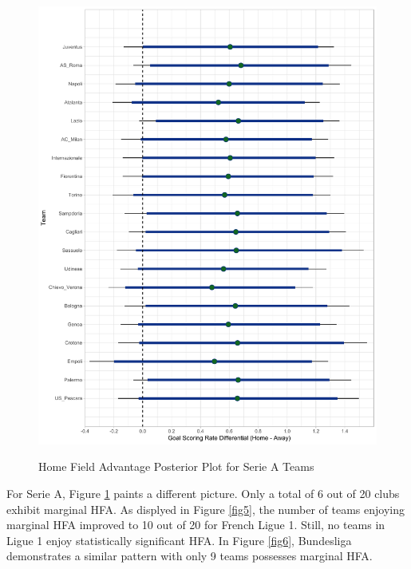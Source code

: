 \documentclass[USenglish]{article}
\begin{document}
\begin{figure}
\caption{Home Field Advantage Posterior Plot for Serie A Teams}
{\includegraphics[width=0.90\linewidth]{HFA_Serie_A11.pdf}}
\label{fig4}
\end{figure}

For Serie A, Figure \ref{fig4} paints a different picture. Only a total of 6 out of 20 clubs exhibit marginal HFA. As displyed in Figure \ref{fig5}, the number of teams enjoying marginal HFA improved to 10 out of 20 for French Ligue 1. Still, no teams in Ligue 1 enjoy statistically significant HFA. In Figure \ref{fig6}, Bundesliga demonstrates a similar pattern with only 9 teams possesses marginal HFA.   
\end{document}
